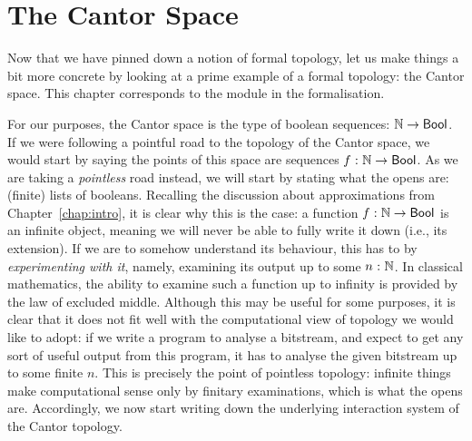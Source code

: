 \chapter{The Cantor Space}\label{chap:cantor}

Now that we have pinned down a notion of formal topology, let us make things a bit more
concrete by looking at a prime example of a formal topology: the Cantor space. This
chapter corresponds to the  module in the \veragda{} formalisation.

For our purposes, the Cantor space is the type of boolean sequences: $\mathbb{N}{} \rightarrow \mathsf{Bool}{}$.
If we were following a pointful road to the topology of the Cantor space, we would start
by saying the points of this space are sequences $f\hspace{0.1mm}:\hspace{0.1mm}\mathbb{N}{} \rightarrow \mathsf{Bool}{}$. As we are
taking a \emph{pointless} road instead, we will start by stating what the opens are:
(finite) lists of booleans. Recalling the discussion about approximations from
Chapter~\ref{chap:intro}, it is clear why this is the case: a function $f\hspace{0.1mm}:\hspace{0.1mm}\mathbb{N}{}
  \rightarrow \mathsf{Bool}{}$ is an infinite object, meaning we will never be able to fully write it down
(i.e., its extension). If we are to somehow understand its behaviour, this has to by
\emph{experimenting with it}, namely, examining its output up to some
$n\hspace{0.1mm}:\hspace{0.1mm}\mathbb{N}{}$. In classical mathematics, the ability to examine such a function up
to infinity is provided by the law of excluded middle. Although this may be useful for
some purposes, it is clear that it does not fit well with the computational view of
topology we would like to adopt: if we write a program to analyse a bitstream, and expect
to get any sort of useful output from this program, it has to analyse the given bitstream
up to some finite $n$. This is precisely the point of pointless topology: infinite things
make computational sense only by finitary examinations, which is what the opens are.
Accordingly, we now start writing down the underlying interaction system of the Cantor
topology.

